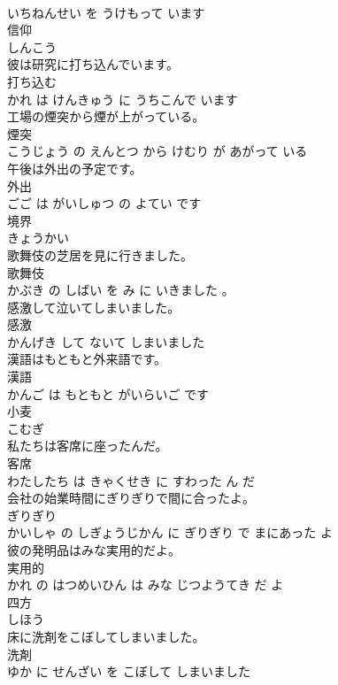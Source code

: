 \documentclass[8pt]{extreport}
\begin{document}
\begin{CJK}{UTF8}{min}
\\	いちねんせい を うけもって います			
\\	信仰	
\\	しんこう			
\\	彼は研究に打ち込んでいます。	
\\	打ち込む 
\\	かれ は けんきゅう に うちこんで います			
\\	工場の煙突から煙が上がっている。	
\\	煙突 
\\	こうじょう の えんとつ から けむり が あがって いる			
\\	午後は外出の予定です。	
\\	外出 
\\	ごご は がいしゅつ の よてい です			
\\	境界	
\\	きょうかい			
\\	歌舞伎の芝居を見に行きました。	
\\	歌舞伎 
\\	かぶき の しばい を み に いきました 。			
\\	感激して泣いてしまいました。	
\\	感激 
\\	かんげき して ないて しまいました			
\\	漢語はもともと外来語です。	
\\	漢語 
\\	かんご は もともと がいらいご です			
\\	小麦	
\\	こむぎ			
\\	私たちは客席に座ったんだ。	
\\	客席 
\\	わたしたち は きゃくせき に すわった ん だ			
\\	会社の始業時間にぎりぎりで間に合ったよ。	
\\	ぎりぎり 
\\	かいしゃ の しぎょうじかん に ぎりぎり で まにあった よ			
\\	彼の発明品はみな実用的だよ。	
\\	実用的 
\\	かれ の はつめいひん は みな じつようてき だ よ			
\\	四方	
\\	しほう			
\\	床に洗剤をこぼしてしまいました。	
\\	洗剤 
\\	ゆか に せんざい を こぼして しまいました			

\end{CJK}
\end{document}
